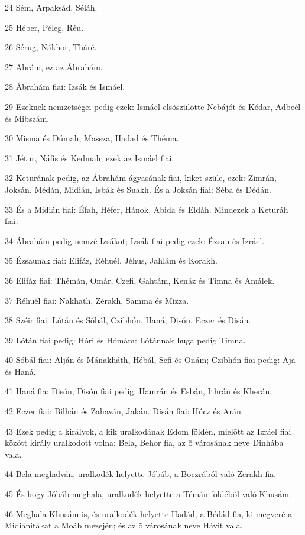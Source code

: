 \par 24 Sém, Arpaksád, Séláh.
\par 25 Héber, Péleg, Réu.
\par 26 Sérug, Nákhor, Tháré.
\par 27 Abrám, ez az Ábrahám.
\par 28 Ábrahám fiai: Izsák és Ismáel.
\par 29 Ezeknek nemzetségei pedig ezek: Ismáel elsõszülötte Nebájót és Kédar, Adbeél és Mibszám.
\par 30 Misma és Dúmah, Massza, Hadad és Théma.
\par 31 Jétur, Náfis és Kedmah; ezek az Ismáel fiai.
\par 32 Keturának pedig, az Ábrahám ágyasának fiai, kiket szüle, ezek: Zimrán, Joksán, Médán, Midián, Isbák és Suakh. És a Joksán fiai: Séba és Dédán.
\par 33 És a Midián fiai: Éfah, Héfer, Hánok, Abida és Eldáh. Mindezek a Keturáh fiai.
\par 34 Ábrahám pedig nemzé Izsákot; Izsák fiai pedig ezek: Ézsau és Izráel.
\par 35 Ézsaunak fiai: Elifáz, Réhuél, Jéhus, Jahlám és Korakh.
\par 36 Elifáz fiai: Thémán, Omár, Czefi, Gahtám, Kenáz és Timna és Amálek.
\par 37 Réhuél fiai: Nakhath, Zérakh, Samma és Mizza.
\par 38 Széir fiai: Lótán és Sóbál, Czibhón, Haná, Disón, Eczer és Disán.
\par 39 Lótán fiai pedig: Hóri és Hómám: Lótánnak huga pedig Timna.
\par 40 Sóbál fiai: Alján és Mánakháth, Hébál, Sefi és Onám; Czibhón fiai pedig: Aja és Haná.
\par 41 Haná fia: Disón, Disón fiai pedig: Hamrán és Esbán, Ithrán és Kherán.
\par 42 Eczer fiai: Bilhán és Zahaván, Jakán. Disán fiai: Húcz és Arán.
\par 43 Ezek pedig a királyok, a kik uralkodának Edom földén, mielõtt az Izráel fiai között király uralkodott volna: Bela, Behor fia, az õ városának neve Dinhába vala.
\par 44 Bela meghalván, uralkodék helyette Jóbáb, a Boczrából való Zerakh fia.
\par 45 És hogy Jóbáb meghala, uralkodék helyette a Témán földébõl való Khusám.
\par 46 Meghala Khusám is, és uralkodék helyette Hadád, a Bédád fia, ki megveré a Midiánitákat a Moáb mezején; és az õ városának neve Hávit vala.
